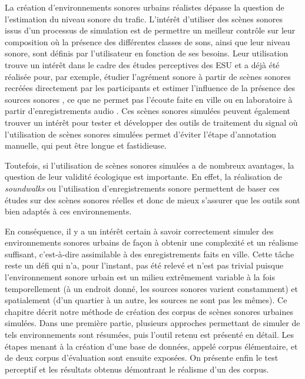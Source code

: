 La création d'environnements sonores urbains réalistes dépasse la question de l'estimation du niveau sonore du trafic. L'intérêt d'utiliser des scènes sonores issus d'un processus de simulation est de permettre un meilleur contrôle sur leur composition où la présence des différentes classes de sons, ainsi que leur niveau sonore, sont définis par l'utilisateur en fonction de ses besoins.
Leur utilisation trouve un intérêt dans le cadre des études perceptives des ESU et a déjà été réalisée pour, par exemple, étudier l'agrément sonore à partir de scènes sonores recréées directement par les participants et estimer l'influence de la présence des sources sonores \cite{lafay_new_2014}, ce que ne permet pas l'écoute faite en ville \cite{adams_soundwalking_2008, liu2014effects} ou en laboratoire à partir d'enregistrements audio \cite{guastavino2005ecological, cain2013development}.
Ces scènes sonores simulées peuvent également trouver un intérêt pour tester et développer des outils de traitement du signal \cite{Komatsu2016, geiger2015improving} où l'utilisation de scènes sonores simulées permet d'éviter l'étape d'annotation manuelle, qui peut être longue et fastidieuse.

Toutefois, si l'utilisation de scènes sonores simulées a de nombreux avantages, la question de leur validité écologique est importante. En effet, la réalisation de \textit{soundwalks} ou l'utilisation d'enregistrements sonore permettent de baser ces études sur des scènes sonores réelles et donc de mieux s'assurer que les outils sont bien adaptés à ces environnements.

En conséquence, il y a un intérêt certain à savoir correctement simuler des environnements sonores urbains de façon à obtenir une complexité et un réalisme suffisant, c'est-à-dire assimilable à des enregistrements faits en ville. Cette tâche reste un défi qui n'a, pour l'instant, pas été relevé et n'est pas trivial puisque l'environnement sonore urbain est un milieu extrêmement variable à la fois temporellement (à un endroit donné, les sources sonores varient constamment) et spatialement (d'un quartier à un autre, les sources ne sont pas les mêmes).
Ce chapitre décrit notre méthode de création des corpus de scènes sonores urbaines simulées. Dans une première partie, plusieurs approches permettant de simuler de tels environnements sont résumées, puis l'outil retenu est présenté en détail. Les étapes menant à la création d'une base de données, appelé corpus élémentaire, et de deux corpus d'évaluation sont ensuite exposées. On présente enfin le test perceptif et les résultats obtenus démontrant le réalisme d'un des corpus.


